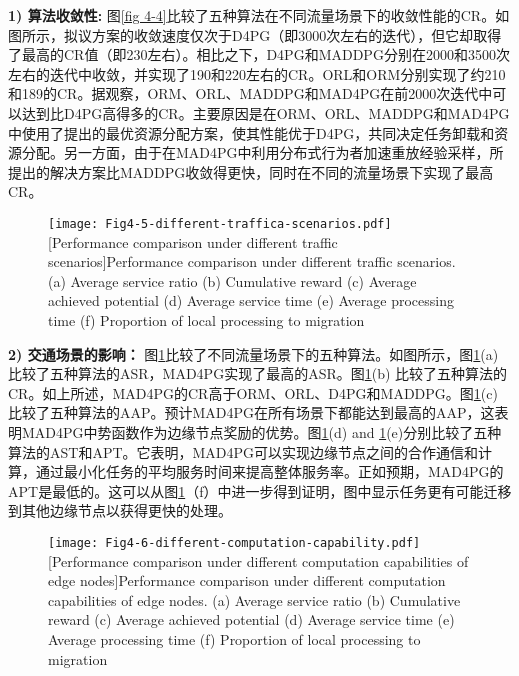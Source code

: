 \textbf{1) 算法收敛性:} 图\ref{fig 4-4}比较了五种算法在不同流量场景下的收敛性能的CR。如图所示，拟议方案的收敛速度仅次于D4PG（即3000次左右的迭代），但它却取得了最高的CR值（即230左右）。相比之下，D4PG和MADDPG分别在2000和3500次左右的迭代中收敛，并实现了190和220左右的CR。ORL和ORM分别实现了约210和189的CR。据观察，ORM、ORL、MADDPG和MAD4PG在前2000次迭代中可以达到比D4PG高得多的CR。主要原因是在ORM、ORL、MADDPG和MAD4PG中使用了提出的最优资源分配方案，使其性能优于D4PG，共同决定任务卸载和资源分配。另一方面，由于在MAD4PG中利用分布式行为者加速重放经验采样，所提出的解决方案比MADDPG收敛得更快，同时在不同的流量场景下实现了最高CR。

\begin{figure}[h]
\centering
  \texttt{[image: Fig4-5-different-traffica-scenarios.pdf]}
  [Performance comparison under different traffic scenarios]{Performance comparison under different traffic scenarios. (a) Average service ratio (b) Cumulative reward (c) Average achieved potential (d) Average service time (e) Average processing time (f) Proportion of local processing to migration}
  \label{fig 4-5}
\end{figure}

\textbf{2) 交通场景的影响：} 图\ref{fig 4-5}比较了不同流量场景下的五种算法。如图所示，图\ref{fig 4-5}(a)比较了五种算法的ASR，MAD4PG实现了最高的ASR。图\ref{fig 4-5}(b) 比较了五种算法的CR。如上所述，MAD4PG的CR高于ORM、ORL、D4PG和MADDPG。图\ref{fig 4-5}(c) 比较了五种算法的AAP。预计MAD4PG在所有场景下都能达到最高的AAP，这表明MAD4PG中势函数作为边缘节点奖励的优势。图\ref{fig 4-5}(d) and \ref{fig 4-5}(e)分别比较了五种算法的AST和APT。它表明，MAD4PG可以实现边缘节点之间的合作通信和计算，通过最小化任务的平均服务时间来提高整体服务率。正如预期，MAD4PG的APT是最低的。这可以从图\ref{fig 4-5}（f）中进一步得到证明，图中显示任务更有可能迁移到其他边缘节点以获得更快的处理。


\begin{figure}[h]
\centering
  \texttt{[image: Fig4-6-different-computation-capability.pdf]}
  [Performance comparison under different computation capabilities of edge nodes]{Performance comparison under different computation capabilities of edge nodes. (a) Average service ratio (b) Cumulative reward (c) Average achieved potential (d) Average service time (e) Average processing time (f) Proportion of local processing to migration}
  \label{fig 4-6}
\end{figure} 

